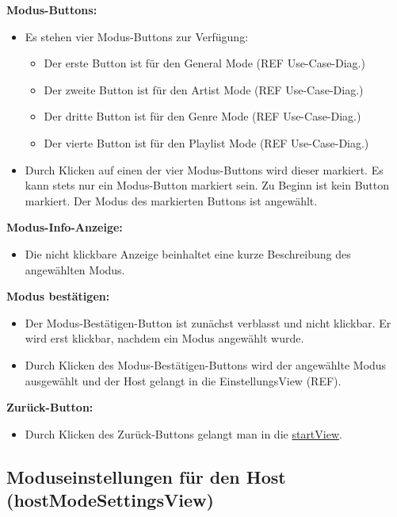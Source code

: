 \documentclass[oneside, ngerman]{sdqtechreport}
\begin{document}
\textbf{Modus-Buttons:}
\begin{itemize}
    \item Es stehen vier Modus-Buttons zur Verfügung:
    \begin{itemize}
        \item Der erste Button ist für den General Mode (REF Use-Case-Diag.)
        \item Der zweite Button ist für den Artist Mode (REF Use-Case-Diag.)
        \item Der dritte Button ist für den Genre Mode (REF Use-Case-Diag.)
        \item Der vierte Button ist für den Playlist Mode (REF Use-Case-Diag.)
    \end{itemize}
    \item Durch Klicken auf einen der vier Modus-Buttons wird dieser markiert. Es kann stets nur ein Modus-Button markiert sein. Zu Beginn ist kein Button markiert. Der Modus des markierten Buttons ist angewählt.
\end{itemize}

\textbf{Modus-Info-Anzeige:}
\begin{itemize}
    \item Die nicht klickbare Anzeige beinhaltet eine kurze Beschreibung des angewählten Modus.
\end{itemize}

\textbf{Modus bestätigen:}
\begin{itemize}
    \item Der Modus-Bestätigen-Button ist zunächst verblasst und nicht klickbar. Er wird erst klickbar, nachdem ein Modus angewählt wurde.
    \item Durch Klicken des Modus-Bestätigen-Buttons wird der angewählte Modus ausgewählt und der Host gelangt in die EinstellungsView (REF).
\end{itemize}

\textbf{Zurück-Button:}
\begin{itemize}
    \item Durch Klicken des Zurück-Buttons gelangt man in die  \hyperlink{startView}{startView}.
\end{itemize}


\subsection{Moduseinstellungen für den Host (hostModeSettingsView)}
\label{sec:Benutzeroberfläche:hostModeSettingsView}
\end{document}
